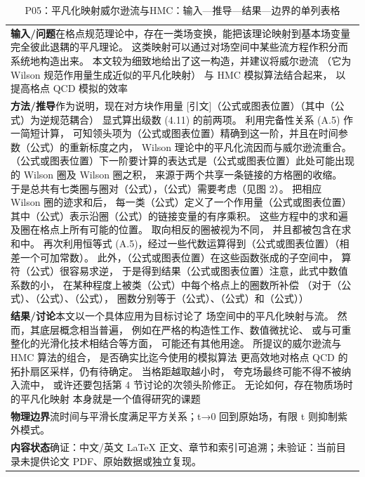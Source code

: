\documentclass[UTF8,11pt,oneside]{ctexbook}
\begin{document}
\begin{table}[htbp]
  \centering
  \caption*{P05：平凡化映射威尔逊流与HMC：输入—推导—结果—边界的单列表格}
  \small
  \begin{tabular}{@{}p{}@{}}
    \toprule
    \textbf{输入/问题}\quad 在格点规范理论中，存在一类场变换，能把该理论映射到基本场变量完全彼此退耦的平凡理论。 这类映射可以通过对场空间中某些流方程作积分而系统地构造出来。 本文较为细致地给出了这一构造，并建议将威尔逊流 （它为 Wilson 规范作用量生成近似的平凡化映射） 与 HMC 模拟算法结合起来， 以提高格点 QCD 模拟的效率 \\
    \textbf{方法/推导}\quad 作为说明，现在对方块作用量 [引文]（公式或图表位置）（其中（公式）为逆规范耦合） 显式算出级数 (4.11) 的前两项。 利用完备性关系 (A.5) 作一简短计算， 可知领头项为（公式或图表位置）精确到这一阶，并且在时间参数（公式）的重新标度之内， Wilson 理论中的平凡化流因而与威尔逊流重合。（公式或图表位置）下一阶要计算的表达式是（公式或图表位置）此处可能出现的 Wilson 圈及 Wilson 圈之积， 来源于两个共享一条链接的方格圈的收缩。 于是总共有七类圈与圈对（公式），（公式）需要考虑（见图 2）。 把相应 Wilson 圈的迹求和后， 每一类（公式）定义了一个作用量（公式或图表位置）其中（公式）表示沿圈（公式）的链接变量的有序乘积。 这些方程中的求和遍及圈在格点上所有可能的位置。 取向相反的圈被视为不同， 并且都被包含在求和中。 再次利用恒等式 (A.5)，经过一些代数运算得到（公式或图表位置）（相差一个可加常数）。 此外，（公式或图表位置）在这些函数张成的子空间中， 算符（公式）很容易求逆， 于是得到结果（公式或图表位置）注意，此式中数值系数的小， 在某种程度上被类（公式）中每个格点上的圈数所补偿 （对于（公式）、（公式）、（公式）， 圈数分别等于（公式）、（公式）和（公式）） \\
    \textbf{结果/讨论}\quad 本文以一个具体应用为目标讨论了 场空间中的平凡化映射与流。 然而，其底层概念相当普遍， 例如在严格的构造性工作、数值微扰论、 或与可重整化的光滑化技术相结合等方面， 可能还有其他用途。 所提议的威尔逊流与 HMC 算法的组合， 是否确实比迄今使用的模拟算法 更高效地对格点 QCD 的拓扑扇区采样，仍有待确定。 当格距越取越小时， 夸克场最终可能不得不被纳入流中， 或许还要包括第 4 节讨论的次领头阶修正。 无论如何，存在物质场时的平凡化映射 本身就是一个值得研究的课题 \\
    \textbf{物理边界}\quad 流时间与平滑长度满足平方关系；t→0 回到原始场，有限 t 则抑制紫外模式。 \\
    \textbf{内容状态}\quad 确证：中文/英文 LaTeX 正文、章节和索引可追溯；未验证：当前目录未提供论文 PDF、原始数据或独立复现。 \\
    \bottomrule
  \end{tabular}
\end{table}
\end{document}

